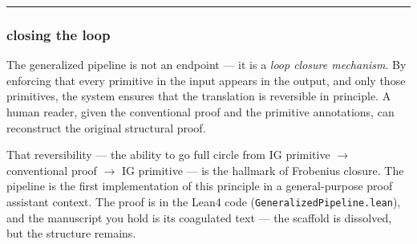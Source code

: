 \documentclass[12pt,a4paper]{article}
\begin{document}
\begin{center}
\rule{0.5\textwidth}{0.4pt}
\end{center}

\subsubsection{closing the loop}

The generalized pipeline is not an endpoint --- it is a \emph{loop closure mechanism}. By enforcing that every primitive in the input appears in the output, and only those primitives, the system ensures that the translation is reversible in principle. A human reader, given the conventional proof and the primitive annotations, can reconstruct the original structural proof.

That reversibility --- the ability to go full circle from IG primitive $\rightarrow$ conventional proof $\rightarrow$ IG primitive --- is the hallmark of Frobenius closure. The pipeline is the first implementation of this principle in a general-purpose proof assistant context. The proof is in the Lean4 code (\texttt{GeneralizedPipeline.lean}), and the manuscript you hold is its coagulated text --- the scaffold is dissolved, but the structure remains.
\end{document}
